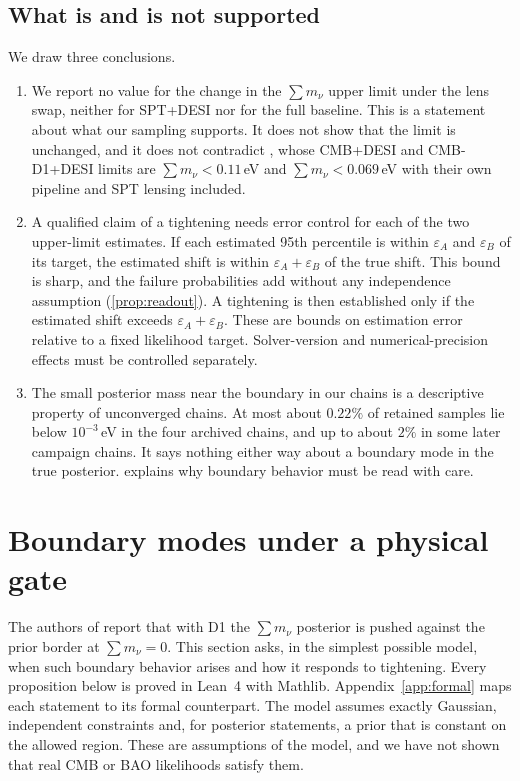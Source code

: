 \documentclass[11pt]{article}
\theoremstyle{remark}
\newcommand{\mnu}{\sum m_\nu}
\numberwithin{equation}{section}
\begin{document}
\subsection{What is and is not supported}
We draw three conclusions.
\begin{enumerate}[leftmargin=*, itemsep=2pt]
  \item We report no value for the change in the $\mnu$ upper limit under the lens swap, neither for SPT+DESI nor for the full baseline. This is a statement about what our sampling supports. It does not show that the limit is unchanged, and it does not contradict \cite{arxiv2601_16277}, whose CMB+DESI and CMB-D1+DESI limits are $\mnu<0.11$\,eV and $\mnu<0.069$\,eV with their own pipeline and SPT lensing included.
  \item A qualified claim of a tightening needs error control for each of the two upper-limit estimates. If each estimated 95th percentile is within $\varepsilon_A$ and $\varepsilon_B$ of its target, the estimated shift is within $\varepsilon_A+\varepsilon_B$ of the true shift. This bound is sharp, and the failure probabilities add without any independence assumption (\cref{prop:readout}). A tightening is then established only if the estimated shift exceeds $\varepsilon_A+\varepsilon_B$. These are bounds on estimation error relative to a fixed likelihood target. Solver-version and numerical-precision effects must be controlled separately.
  \item The small posterior mass near the boundary in our chains is a descriptive property of unconverged chains. At most about $0.22\%$ of retained samples lie below $10^{-3}$\,eV in the four archived chains, and up to about $2\%$ in some later campaign chains. It says nothing either way about a boundary mode in the true posterior.  explains why boundary behavior must be read with care.
\end{enumerate}
 \section{Boundary modes under a physical gate}
\label{sec:boundary-mode}

The authors of \cite{arxiv2601_16277} report that with D1 the $\mnu$ posterior is pushed against the prior border at $\mnu=0$. This section asks, in the simplest possible model, when such boundary behavior arises and how it responds to tightening. Every proposition below is proved in Lean~4 with Mathlib. Appendix~\ref{app:formal} maps each statement to its formal counterpart. The model assumes exactly Gaussian, independent constraints and, for posterior statements, a prior that is constant on the allowed region. These are assumptions of the model, and we have not shown that real CMB or BAO likelihoods satisfy them.
\end{document}
